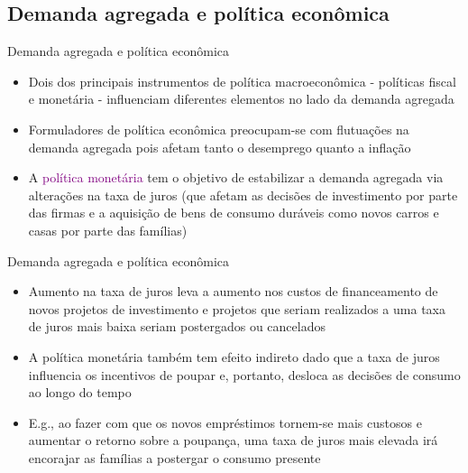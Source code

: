 \documentclass[10pt]{beamer}
\begin{document}
\subsection{Demanda agregada e política econômica}
\begin{frame}{Demanda agregada e política econômica}
    \begin{itemize}
        \item Dois dos principais instrumentos de política macroeconômica - políticas fiscal e monetária - influenciam diferentes elementos no lado da demanda agregada\bigskip
         
        \item Formuladores de política econômica preocupam-se com flutuações na demanda agregada pois afetam tanto o desemprego quanto a inflação\bigskip
         
        \item A \textcolor{purple}{política monetária} tem o objetivo de estabilizar a demanda agregada via alterações na taxa de juros (que afetam as decisões de investimento por parte das firmas e a aquisição de bens de consumo duráveis como novos carros e casas por parte das famílias)
    \end{itemize}
\end{frame}

\begin{frame}{Demanda agregada e política econômica}
    \begin{itemize}
        \item Aumento na taxa de juros leva a aumento nos custos de financeamento de novos projetos de investimento e projetos que seriam realizados a uma taxa de juros mais baixa seriam postergados ou cancelados\bigskip
         
        \item A política monetária também tem efeito indireto dado que a taxa de juros influencia os incentivos de poupar e, portanto, desloca as decisões de consumo ao longo do tempo\bigskip
         
        \item E.g., ao fazer com que os novos empréstimos tornem-se mais custosos e aumentar o retorno sobre a poupança, uma taxa de juros mais elevada irá encorajar as famílias a postergar o consumo presente
    \end{itemize}
\end{frame}
\end{document}
